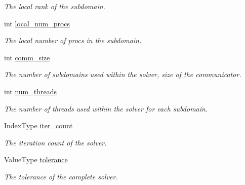 \begin{DoxyCompactItemize}
\begin{DoxyCompactList}\small\item\em The local rank of the subdomain. \end{DoxyCompactList}\item 
\mbox{\label{structschwz_1_1Metadata_a1023b28f7655d4053423d75d0e98eee8}} 
int \hyperlink{structschwz_1_1Metadata_a1023b28f7655d4053423d75d0e98eee8}{local\+\_\+num\+\_\+procs}
\begin{DoxyCompactList}\small\item\em The local number of procs in the subdomain. \end{DoxyCompactList}\item 
\mbox{\label{structschwz_1_1Metadata_aae2c0f118e53c26239ada9c3f71b0eae}} 
int \hyperlink{structschwz_1_1Metadata_aae2c0f118e53c26239ada9c3f71b0eae}{comm\+\_\+size}
\begin{DoxyCompactList}\small\item\em The number of subdomains used within the solver, size of the communicator. \end{DoxyCompactList}\item 
\mbox{\label{structschwz_1_1Metadata_ac6a6052778d497a1d1aa9804c0bd28bc}} 
int \hyperlink{structschwz_1_1Metadata_ac6a6052778d497a1d1aa9804c0bd28bc}{num\+\_\+threads}
\begin{DoxyCompactList}\small\item\em The number of threads used within the solver for each subdomain. \end{DoxyCompactList}\item 
\mbox{\label{structschwz_1_1Metadata_acd8efc17b3d0a1804dc0a5bf40af586c}} 
Index\+Type \hyperlink{structschwz_1_1Metadata_acd8efc17b3d0a1804dc0a5bf40af586c}{iter\+\_\+count}
\begin{DoxyCompactList}\small\item\em The iteration count of the solver. \end{DoxyCompactList}\item 
Value\+Type \hyperlink{structschwz_1_1Metadata_a366db94e2a75dbdd82616e0d0b33bb86}{tolerance}
\begin{DoxyCompactList}\small\item\em The tolerance of the complete solver. \end{DoxyCompactList}\item 

\end{DoxyCompactItemize}
